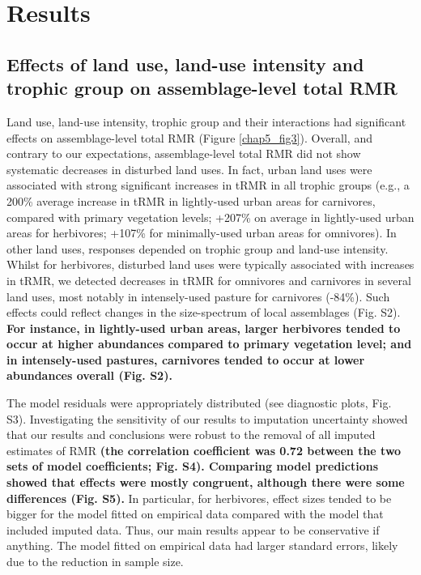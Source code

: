 \section{Results}

\subsection{Effects of land use, land-use intensity and trophic group on assemblage-level total RMR}

Land use, land-use intensity, trophic group and their interactions had significant effects on assemblage-level total RMR (Figure \ref{chap5_fig3}). Overall, and contrary to our expectations, assemblage-level total RMR did not show systematic decreases in disturbed land uses. In fact, urban land uses were associated with strong significant increases in tRMR in all trophic groups (e.g., a 200\% average increase in tRMR in lightly-used urban areas for carnivores, compared with primary vegetation levels; +207\% on average in lightly-used urban areas for herbivores; +107\% for minimally-used urban areas for omnivores). In other land uses, responses depended on trophic group and land-use intensity. Whilst for herbivores, disturbed land uses were typically associated with increases in tRMR, we detected decreases in tRMR for omnivores and carnivores in several land uses, most notably in intensely-used pasture for carnivores (-84\%). Such effects could reflect changes in the size-spectrum of local assemblages (Fig. S2). \textbf{For instance, in lightly-used urban areas, larger herbivores tended to occur at higher abundances compared to primary vegetation level; and in intensely-used pastures, carnivores tended to occur at lower abundances overall (Fig. S2).}

\vspace{0.5cm}
The model residuals were appropriately distributed (see diagnostic plots, Fig. S3). Investigating the sensitivity of our results to imputation uncertainty showed that our results and conclusions were robust to the removal of all imputed estimates of RMR \textbf{(the correlation coefficient was 0.72 between the two sets of model coefficients; Fig. S4). Comparing model predictions showed that effects were mostly congruent, although there were some differences (Fig. S5).} In particular, for herbivores, effect sizes tended to be bigger for the model fitted on empirical data compared with the model that included imputed data. Thus, our main results appear to be conservative if anything. The model fitted on empirical data had larger standard errors, likely due to the reduction in sample size. 

